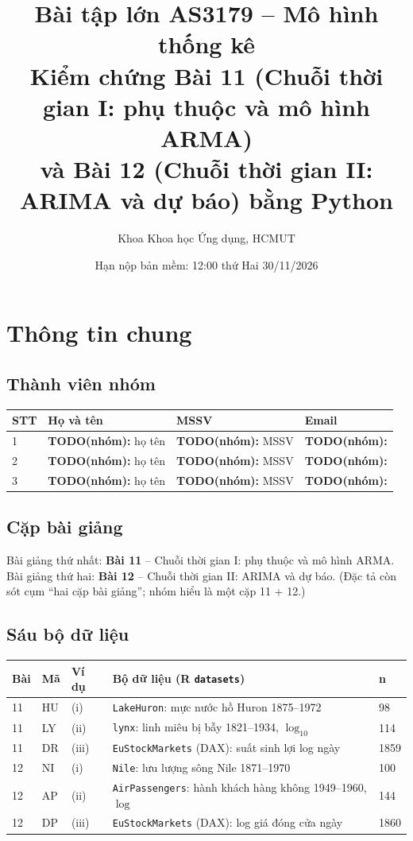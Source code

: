 \documentclass[12pt,a4paper]{article}
\title{Bài tập lớn AS3179 -- Mô hình thống kê\\[4pt]
\large Kiểm chứng Bài 11 (Chuỗi thời gian I: phụ thuộc và mô hình ARMA)\\ và Bài 12 (Chuỗi thời gian II: ARIMA và dự báo) bằng Python}
\author{Khoa Khoa học Ứng dụng, HCMUT\\ \TODO{tên nhóm}}
\date{Hạn nộp bản mềm: 12:00 thứ Hai 30/11/2026}
\newcommand{\TODO}[1]{{\color{red}\textbf{TODO(nhóm):} #1}}
\begin{document}
\maketitle
\tableofcontents
\newpage

\section{Thông tin chung}
\subsection*{Thành viên nhóm}
\begin{tabular}{@{}llll@{}}\toprule STT & Họ và tên & MSSV & Email \\ \midrule
1 & \TODO{họ tên} & \TODO{MSSV} & \TODO{} \\
2 & \TODO{họ tên} & \TODO{MSSV} & \TODO{} \\
3 & \TODO{họ tên} & \TODO{MSSV} & \TODO{} \\ \bottomrule\end{tabular}

\subsection*{Cặp bài giảng}
Bài giảng thứ nhất: \textbf{Bài 11} -- Chuỗi thời gian I: phụ thuộc và mô hình ARMA. Bài giảng thứ hai: \textbf{Bài 12} -- Chuỗi thời gian II: ARIMA và dự báo.
(Đặc tả còn sót cụm ``hai cặp bài giảng''; nhóm hiểu là một cặp 11 + 12.)

\subsection*{Sáu bộ dữ liệu}
\begin{tabular}{@{}lllll@{}}\toprule Bài & Mã & Ví dụ & Bộ dữ liệu (R \texttt{datasets}) & n \\ \midrule
11 & HU & (i) & \texttt{LakeHuron}: mực nước hồ Huron 1875--1972 & 98 \\
11 & LY & (ii) & \texttt{lynx}: linh miêu bị bẫy 1821--1934, $\log_{10}$ & 114 \\
11 & DR & (iii) & \texttt{EuStockMarkets} (DAX): suất sinh lợi log ngày & 1859 \\
12 & NI & (i) & \texttt{Nile}: lưu lượng sông Nile 1871--1970 & 100 \\
12 & AP & (ii) & \texttt{AirPassengers}: hành khách hàng không 1949--1960, $\log$ & 144 \\
12 & DP & (iii) & \texttt{EuStockMarkets} (DAX): log giá đóng cửa ngày & 1860 \\ \bottomrule\end{tabular}
\end{document}
